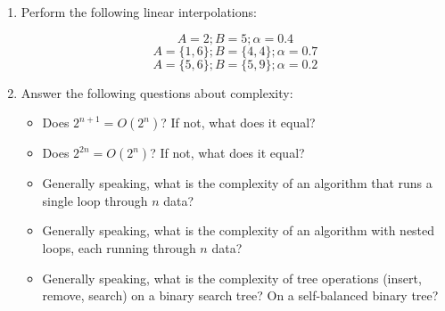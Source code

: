 \documentclass[a4paper,12pt]{article}
\begin{document}
\begin{enumerate}
\begin{enumerate}
\end{enumerate}



\item Perform the following linear interpolations:

\vspace{-10pt}
$$A=2; B=5; \alpha=0.4$$
$$A=\{1,6\}; B=\{4,4\}; \alpha=0.7$$
$$A=\{5,6\}; B=\{5,9\}; \alpha=0.2$$



\item Answer the following questions about complexity:

\begin{itemize}
	\item Does $2^{n+1}=O(2^n)$? If not, what does it equal?
	\item Does $2^{2n}=O(2^n)$? If not, what does it equal?
	\item Generally speaking, what is the complexity of an algorithm that runs a single loop through $n$ data?
	\item Generally speaking, what is the complexity of an algorithm with nested loops, each running through $n$ data?
	\item Generally speaking, what is the complexity of tree operations (insert, remove, search) on a binary search tree? On a self-balanced binary tree?
\end{itemize}



\end{enumerate}
\end{document}
